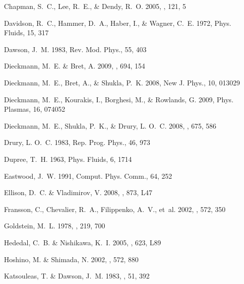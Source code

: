 \documentclass[structabstract]{aa}
\begin{document}
\begin{thebibliography}{71}
Chapman, S.~C., Lee, R.~E., \& Dendy, R.~O. 2005, \ssr, 121, 5

Davidson, R.~C., Hammer, D.~A., Haber, I., \& Wagner, C.~E. 1972, Phys. Fluids,
  15, 317

Dawson, J.~M. 1983, Rev. Mod. Phys., 55, 403

Dieckmann, M.~E. \& Bret, A. 2009, \apj, 694, 154

Dieckmann, M.~E., Bret, A., \& Shukla, P.~K. 2008{}, New J. Phys.,
  10, 013029

Dieckmann, M.~E., Kourakis, I., Borghesi, M., \& Rowlands, G. 2009, Phys.
  Plasmas, 16, 074052

Dieckmann, M.~E., Shukla, P.~K., \& Drury, L. O.~C. 2008{}, \apj,
  675, 586

Drury, L. O.~C. 1983, Rep. Prog. Phys., 46, 973

Dupree, T.~H. 1963, Phys. Fluids, 6, 1714

Eastwood, J.~W. 1991, Comput. Phys. Comm., 64, 252

Ellison, D.~C. \& Vladimirov, V. 2008, \apjl, 873, L47

Fransson, C., Chevalier, R.~A., Filippenko, A.~V., {et~al.} 2002, \apj, 572,
  350

Goldstein, M.~L. 1978, \apj, 219, 700

Hededal, C.~B. \& Nishikawa, K.~I. 2005, \apjl, 623, L89

Hoshino, M. \& Shimada, N. 2002, \apj, 572, 880

Katsouleas, T. \& Dawson, J.~M. 1983, \prl, 51, 392


\end{thebibliography}
\end{document}
